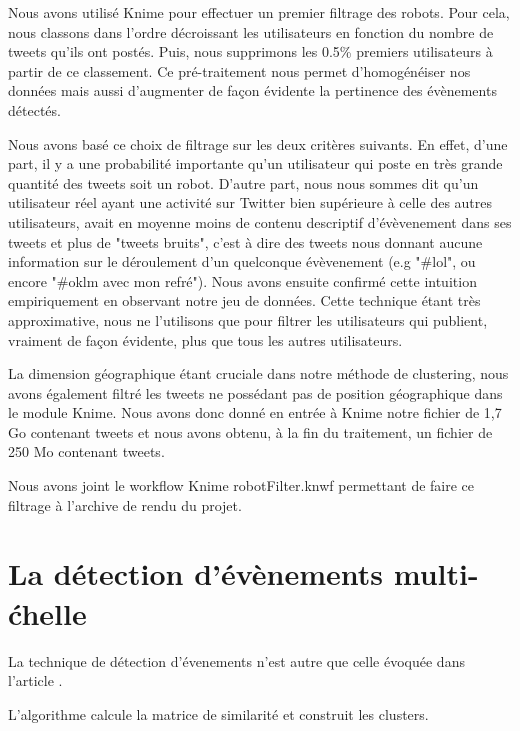 \documentclass[12pt]{article}
\begin{document}
Nous avons utilis\'e Knime pour effectuer un premier filtrage des robots. Pour cela, nous classons dans l'ordre d\'ecroissant les utilisateurs en fonction du nombre de tweets qu'ils ont post\'es. Puis, nous supprimons les 0.5\% premiers utilisateurs \`{a} partir de ce classement. Ce pr\'e-traitement nous permet d'homog\'en\'eiser nos donn\'ees mais aussi d'augmenter de fa\c{c}on \'evidente la pertinence des \'ev\`enements d\'etect\'es. 

Nous avons bas\'e ce choix de filtrage sur les deux crit\`eres suivants. En effet, d'une part, il y a une probabilit\'e importante qu'un utilisateur qui poste en tr\`es grande quantit\'e des tweets soit un robot. D'autre part, nous nous sommes dit qu'un utilisateur r\'eel ayant une activit\'e sur Twitter bien sup\'erieure \`{a} celle des autres utilisateurs, avait en moyenne moins de contenu descriptif d'\'ev\`evenement dans ses tweets et plus de "tweets bruits", c'est \`{a} dire des tweets nous donnant aucune information sur le d\'eroulement d'un quelconque \'ev\`evenement (e.g "\#lol", ou encore "\#oklm avec mon refr\'e"). Nous avons ensuite confirm\'e cette intuition empiriquement en observant notre jeu de donn\'ees. 
\newline
Cette technique \'etant tr\`es approximative, nous ne l'utilisons que pour filtrer les utilisateurs qui publient, vraiment de fa\c{c}on \'evidente, plus que tous les autres utilisateurs.

La dimension g\'eographique \'etant cruciale dans notre m\'ethode de clustering, nous avons \'egalement filtr\'e les tweets ne poss\'edant pas de position g\'eographique dans le module Knime. Nous avons donc donn\'e en entr\'ee \`{a} Knime notre fichier de 1,7 Go contenant  tweets et nous avons obtenu, \`{a} la fin du traitement, un fichier de 250 Mo contenant  tweets. 

Nous avons joint le workflow Knime robotFilter.knwf permettant de faire ce filtrage \`a l'archive de rendu du projet.

\vfill
\newpage

\section{La d\'etection d'\'ev\`enements multi-\'chelle}
\label{sec:multiscale}

La technique de d\'etection d'\'evenements n'est autre que celle \'evoqu\'ee dans l'article \cite{Multievents}.

L'algorithme calcule la matrice de similarit\'e et construit les clusters.
\end{document}
